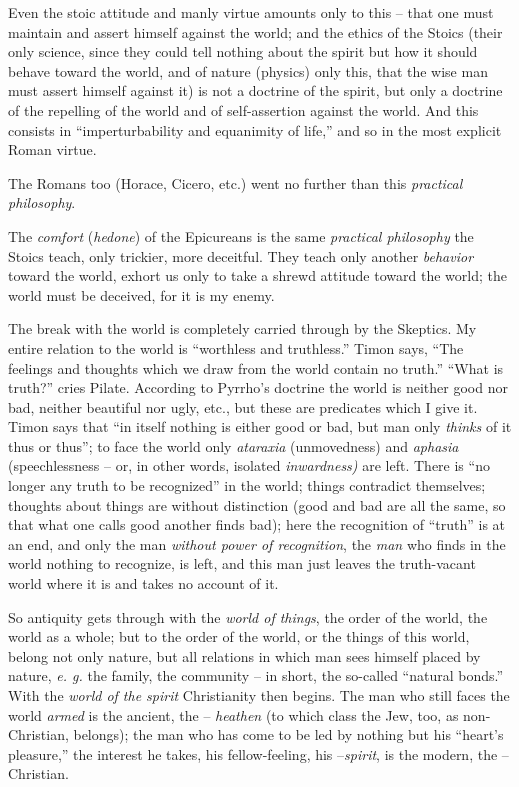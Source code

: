 \documentclass[12pt,a4paper]{book}
\begin{document}
Even the stoic attitude and manly virtue amounts only to this -- that one must 
maintain and assert himself against the world; and the ethics of the Stoics 
(their only science, since they could tell nothing about the spirit but how it 
should behave toward the world, and of nature (physics) only this, that the 
wise man must assert himself against it) is not a doctrine of the spirit, but 
only a doctrine of the repelling of the world and of self-assertion against 
the world. And this consists in ``imperturbability and equanimity of life,'' 
and so in the most explicit Roman virtue.

The Romans too (Horace, Cicero, etc.) went no further than this 
\textit{practical philosophy}.

The \textit{comfort} (\textit{hedone}) of the Epicureans is the same 
\textit{practical philosophy} the Stoics teach, only trickier, more deceitful. 
They teach only another \textit{behavior} toward the world, exhort us only to 
take a shrewd attitude toward the world; the world must be deceived, for it is 
my enemy.

The break with the world is completely carried through by the Skeptics. My 
entire relation to the world is ``worthless and truthless.'' Timon says, 
``The feelings and thoughts which we draw from the world contain no truth.'' 
``What is truth?'' cries Pilate. According to Pyrrho's doctrine the world is 
neither good nor bad, neither beautiful nor ugly, etc., but these are 
predicates which I give it. Timon says that ``in itself nothing is either 
good or bad, but man only \textit{thinks} of it thus or thus''; to face the 
world only \textit{ataraxia} (unmovedness) and \textit{aphasia} 
(speechlessness -- or, in other words, isolated \textit{inwardness)} are left. 
There is ``no longer any truth to be recognized'' in the world; things 
contradict themselves; thoughts about things are without distinction (good and 
bad are all the same, so that what one calls good another finds bad); here the 
recognition of ``truth'' is at an end, and only the man \textit{without 
power of recognition}, the \textit{man} who finds in the world nothing to 
recognize, is left, and this man just leaves the truth-vacant world where it 
is and takes no account of it.

So antiquity gets through with the \textit{world of things}, the order of the 
world, the world as a whole; but to the order of the world, or the things of 
this world, belong not only nature, but all relations in which man sees 
himself placed by nature, \textit{e. g.} the family, the community -- in 
short, the so-called ``natural bonds.'' With the \textit{world of the 
spirit} Christianity then begins. The man who still faces the world 
\textit{armed} is the ancient, the -- \textit{heathen} (to which class the 
Jew, too, as non-Christian, belongs); the man who has come to be led by 
nothing but his ``heart's pleasure,'' the interest he takes, his 
fellow-feeling, his --\textit{spirit}, is the modern, the -- Christian.
\end{document}
